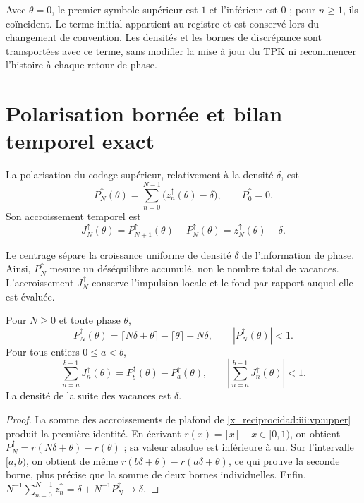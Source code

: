 Avec $\theta=0$, le premier symbole supérieur est $1$ et l'inférieur est $0$ ; pour $n\geq1$, ils coïncident. Le terme initial appartient au registre et est conservé lors du changement de convention. Les densités et les bornes de discrépance sont transportées avec ce terme, sans modifier la mise à jour du TPK ni recommencer l'histoire à chaque retour de phase.

\section{Polarisation bornée et bilan temporel exact}

\begin{definition}
La polarisation du codage supérieur, relativement à la densité
$\delta$, est
\begin{equation}
 P_N^{\uparrow}(\theta)
 =\sum_{n=0}^{N-1}\bigl(z_n^{\uparrow}(\theta)-\delta\bigr),
 \qquad P_0^{\uparrow}=0.
 \label{x_reciprocidad:iii:vp:polarization}
\end{equation}
Son accroissement temporel est
\begin{equation}
 J_N^{\uparrow}(\theta)
 =P_{N+1}^{\uparrow}(\theta)-P_N^{\uparrow}(\theta)
 =z_N^{\uparrow}(\theta)-\delta.
 \label{x_reciprocidad:iii:vp:current}
\end{equation}
\end{definition}

Le centrage sépare la croissance uniforme de densité $\delta$ de
l’information de phase. Ainsi, $P_N^{\uparrow}$ mesure un déséquilibre accumulé,
non le nombre total de vacances. L’accroissement $J_N^{\uparrow}$ conserve
l’impulsion locale et le fond par rapport auquel elle est évaluée.

\begin{theorem}
Pour $N\geq0$ et toute phase $\theta$,
\begin{equation}
 P_N^{\uparrow}(\theta)
 =\lceil N\delta+\theta\rceil-\lceil\theta\rceil-N\delta,
 \qquad |P_N^{\uparrow}(\theta)|<1.
 \label{x_reciprocidad:iii:vp:bound}
\end{equation}
Pour tous entiers $0\leq a<b$,
\begin{equation}
 \sum_{n=a}^{b-1}J_n^{\uparrow}(\theta)
 =P_b^{\uparrow}(\theta)-P_a^{\uparrow}(\theta),
 \qquad
 \left|\sum_{n=a}^{b-1}J_n^{\uparrow}(\theta)\right|<1.
 \label{x_reciprocidad:iii:vp:continuity}
\end{equation}
La densité de la suite des vacances est $\delta$.
\end{theorem}
\begin{proof}
La somme des accroissements de plafond de \eqref{x_reciprocidad:iii:vp:upper} produit la première identité. En écrivant $r(x)=\lceil x\rceil-x\in[0,1)$, on obtient $P_N^{\uparrow}=r(N\delta+\theta)-r(\theta)$ ; sa valeur absolue est inférieure à un. Sur l'intervalle $[a,b)$, on obtient de même $r(b\delta+\theta)-r(a\delta+\theta)$, ce qui prouve la seconde borne, plus précise que la somme de deux bornes individuelles. Enfin, $N^{-1}\sum_{n=0}^{N-1}z_n^{\uparrow}
=\delta+N^{-1}P_N^{\uparrow}\to\delta$.
\end{proof}

